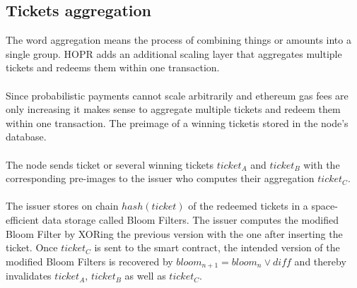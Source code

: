 \subsection{Tickets aggregation}
The word aggregation means the process of combining things or amounts into a single group. 
HOPR adds an additional scaling layer that aggregates multiple tickets and redeems them within one transaction.
\\~\\ Since probabilistic payments cannot scale arbitrarily and ethereum gas fees are only increasing it makes sense to aggregate multiple tickets and redeem them within one transaction.
The preimage of a winning ticketis stored in the node’s database. 
\\~\\ The node sends ticket or several winning tickets $ticket_A$ and $ticket_B$ with the corresponding pre-images to the issuer who computes their aggregation $ticket_C$. 
\\~\\The issuer stores on chain $hash(ticket)$ of the redeemed tickets in a space-efficient data storage called Bloom Filters.
The issuer computes the modified Bloom Filter by XORing the previous version with the one after inserting the ticket.
\newline Once $ticket_C$ is sent to the smart contract, the intended version of the modified Bloom Filters is recovered by $bloom_{n+1} = bloom_n \vee diff$ and thereby invalidates $ticket_A$, $ticket_B$ as well as $ticket_C$.
